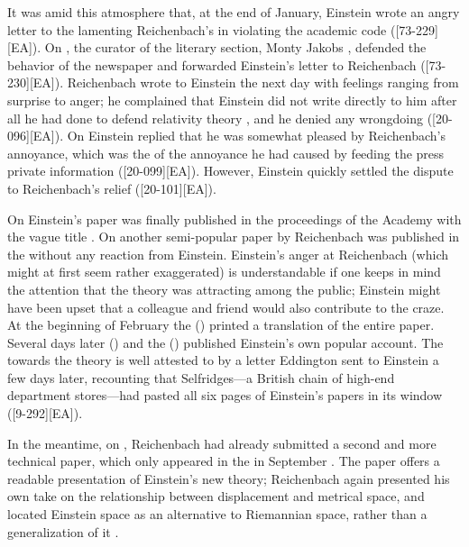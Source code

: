 \documentclass[draft]{article}
\begin{document}
It was amid this atmosphere that, at the end of January, Einstein wrote an angry letter to the  lamenting Reichenbach's  in violating the academic code ([73-229][EA]). On , the curator of the literary section, Monty Jakobs \citep[cf.][]{Badenhausen1974}, defended the behavior of the newspaper and forwarded Einstein's letter to Reichenbach ([73-230][EA]). Reichenbach wrote to Einstein the next day with feelings ranging from surprise to anger; he complained that Einstein did not write directly to him after all he had done to defend relativity theory \citep{Hentschel1982}, and he denied any wrongdoing ([20-096][EA]). On  Einstein replied that he was somewhat pleased by Reichenbach's annoyance, which was the  of the annoyance he had caused by feeding the press private information ([20-099][EA]). However, Einstein quickly settled the dispute to Reichenbach's relief ([20-101][EA]). 


On  Einstein's paper was finally published in the proceedings of the Academy with the vague title  \citep{Einstein1929b}. On  another semi-popular paper by Reichenbach was published in the  \citep{Reichenbach1929b} without any reaction from Einstein. Einstein's anger at Reichenbach (which might at first seem rather exaggerated) is understandable if one keeps in mind the attention that the theory was attracting among the public; Einstein might have been upset that a colleague and friend would also contribute to the craze. At the beginning of February the  () printed a translation of the entire paper. Several days later  () and the  () published Einstein's own popular account. The  towards the theory is well attested to by a letter Eddington sent to Einstein a few days later, recounting that Selfridges---a British chain of high-end department stores---had pasted all six pages of Einstein's papers in its window ([9-292][EA]).


In the meantime, on , Reichenbach had already submitted a second and more technical paper, which only appeared in the  in September \citep{Reichenbach1929a}. The paper offers a readable presentation of Einstein's new theory; Reichenbach again presented his own take on the relationship between displacement and metrical space, and located Einstein space as an alternative to Riemannian space, rather than a generalization of it \citep[684--687]{Reichenbach1929a}. 
\end{document}
